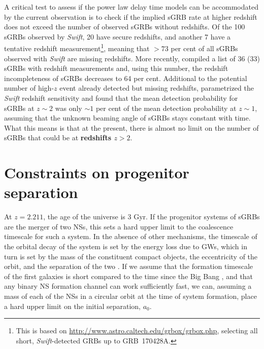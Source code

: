 \documentclass[referee]{aa}
\providecommand{\DIFaddtex}[1]{{\bf #1}} %
\providecommand{\DIFdeltex}[1]{} %
\providecommand{\DIFaddbegin}{} %
\providecommand{\DIFaddend}{} %
\providecommand{\DIFdelbegin}{} %
\providecommand{\DIFdelend}{} %
\providecommand{\DIFadd}[1]{\texorpdfstring{\DIFaddtex{#1}}{#1}} %
\providecommand{\DIFdel}[1]{\texorpdfstring{\DIFdeltex{#1}}{}} %
\newcommand{\DIFscaledelfig}{0.5}
\newlength{\DIFdelgraphicswidth} %
\newlength{\DIFdelgraphicsheight} %
\newcommand{\DIFaddincludegraphics}[2][]{{\color{blue}\fbox{\DIFOincludegraphics[#1]{#2}}}} %
\newcommand{\DIFdelincludegraphics}[2][]{%
\sbox{\DIFdelgraphicsbox}{\DIFOincludegraphics[#1]{#2}}%
\settoboxwidth{\DIFdelgraphicswidth}{\DIFdelgraphicsbox} %
\settoboxtotalheight{\DIFdelgraphicsheight}{\DIFdelgraphicsbox} %
\scalebox{\DIFscaledelfig}{%
\parbox[b]{\DIFdelgraphicswidth}{\usebox{\DIFdelgraphicsbox}\\[-\baselineskip] \rule{\DIFdelgraphicswidth}{0em}}\llap{\resizebox{\DIFdelgraphicswidth}{\DIFdelgraphicsheight}{%
\setlength{\unitlength}{\DIFdelgraphicswidth}%
\begin{picture}(1,1)%
\thicklines\linethickness{2pt} %
{\color[rgb]{1,0,0}\put(0,0){\framebox(1,1){}}}%
{\color[rgb]{1,0,0}\put(0,0){\line( 1,1){1}}}%
{\color[rgb]{1,0,0}\put(0,1){\line(1,-1){1}}}%
\end{picture}%
}\hspace*{3pt}}} %
} %
\DeclareRobustCommand{\DIFaddbegin}{\DIFOaddbegin \let\includegraphics\DIFaddincludegraphics} %
\DeclareRobustCommand{\DIFaddend}{\DIFOaddend \let\includegraphics\DIFOincludegraphics} %
\DeclareRobustCommand{\DIFdelbegin}{\DIFOdelbegin \let\includegraphics\DIFdelincludegraphics} %
\DeclareRobustCommand{\DIFdelend}{\DIFOaddend \let\includegraphics\DIFOincludegraphics} %
\begin{document}
A critical test to assess if the power law delay time models can be accommodated
by the current observation is to check if the implied sGRB rate at higher
redshift does not exceed the number of observed sGRBs without redshifts. Of the
100  sGRBs observed by \textit{Swift}, 20 have secure redshifts, and another 7
have a tentative redshift measurement\footnote{This is based on
	\url{http://www.astro.caltech.edu/grbox/grbox.php}, selecting all short,
	\textit{Swift}-detected GRBs up to GRB~170428A.}, meaning that $> 73$ per cent
of all sGRBs observed with \textit{Swift} are missing redshifts. More recently,
\citet{Fong2017} \citep{LIGOScientificCollaboration2017b} compiled a list of 36
(33) sGRBs with redshift measurements and, using this number, the redshift
incompleteness of sGRBs decreases to 64 per cent. Additional to the potential
number of high-$z$ event already detected but missing redshifts,
\citet{Behroozi2014} parametrized the \textit{Swift} redshift sensitivity and
found that the mean detection probability for sGRBs at $z \sim2$ was only
$\sim1$ per cent of the mean detection probability at $z \sim1$, assuming that
the unknown beaming angle of sGRBs stays constant with time. What this means is
that at the present, there is almost no limit on the number of sGRBs that could
be at \DIFdelbegin \DIFdel{higher redshifts }\DIFdelend \DIFaddbegin \DIFadd{redshifts $z > 2$}\DIFaddend .

\section{Constraints on progenitor separation}

At $z = 2.211$, the age of the universe is 3 Gyr. If the progenitor systems of
sGRBs are the merger of two NSs, this sets a hard upper limit to the coalescence
timescale for such a system. In the absence of other mechanisms, the timescale
of the orbital decay of the system is set by the energy loss due to
GWs, which in turn is set by the mass of the constituent compact
objects, the eccentricity of the orbit, and the separation of the two
\citep{Postnov2014}. If we assume that the formation timescale of the first
galaxies is short compared to the time since the Big Bang \citep{Richard2011},
and that any binary NS formation channel can work sufficiently fast,
we can, assuming a mass of each of the NSs in a circular orbit at the time of
system formation, place a hard upper limit on the initial separation, $a_0$.
\end{document}
